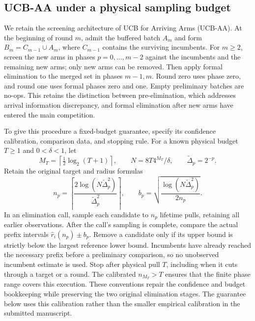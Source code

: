 \subsection{UCB-AA under a physical sampling budget}
\label{sec:ucbaa_fixed_budget}

We retain the screening architecture of UCB for Arriving Arms (UCB-AA).
At the beginning of round $m$, admit the buffered batch $A_m$ and form
$B_m=C_{m-1}\cup A_m$, where $C_{m-1}$ contains the surviving incumbents.
For $m\ge2$, screen the new arms in phases $p=0,\ldots,m-2$ against
the incumbents and the remaining new arms; only new arms can be removed.
Then apply formal elimination to the merged set in phases $m-1,m$.
Round zero uses phase zero, and round one uses formal phases zero and one.
Empty preliminary batches are no-ops. This retains the distinction between
pre-elimination, which addresses arrival information discrepancy, and
formal elimination after new arms have entered the main competition.

To give this procedure a fixed-budget guarantee, specify its confidence
calibration, comparison data, and stopping rule. For a known physical
budget $T\ge1$ and $0<\delta<1$, let
\begin{equation}
 M_T=\left\lceil\tfrac12\log_2(T+1)\right\rceil,\qquad
 N=8T4^{M_T}/\delta,\qquad\widetilde\Delta_p=2^{-p}.
 \label{eq:ucbaa_main_calibration}
\end{equation}
Retain the original target and radius formulas
\begin{equation}
 n_p=\left\lceil
       \frac{2\log(N\widetilde\Delta_p^2)}{\widetilde\Delta_p^2}
      \right\rceil,\qquad
 b_p=\sqrt{\frac{\log(N\widetilde\Delta_p^2)}{2n_p}}.
 \label{eq:ucbaa_main_targets}
\end{equation}
In an elimination call, sample each candidate to $n_p$ lifetime pulls,
retaining all earlier observations. After the call's sampling is complete,
compare the actual prefix intervals
$\hat r_i(n_p)\pm b_p$. Remove a candidate only if its upper bound is
strictly below the largest reference lower bound. Incumbents have already
reached the necessary prefix before a preliminary comparison, so no
unobserved incumbent estimate is used. Stop after physical pull $T$,
including when it cuts through a target or a round. The calibrated
$n_{M_T}>T$ ensures that the finite phase range covers this execution.
These conventions repair the confidence and budget bookkeeping while
preserving the two original elimination stages. The guarantee below uses
this calibration rather than the smaller empirical calibration in the
submitted manuscript.

